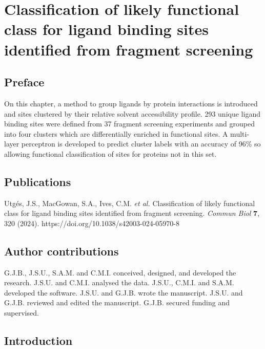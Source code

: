 \chapter{Classification of likely functional class for ligand binding sites identified from fragment screening}

\section*{Preface}

On this chapter, a method to group ligands by protein interactions is introduced and sites clustered by their relative solvent accessibility profile. 293 unique ligand binding sites were defined from 37 fragment screening experiments and grouped into four clusters which are differentially enriched in functional sites. A multi-layer perceptron is developed to predict cluster labels with an accuracy of 96\% so allowing functional classification of sites for proteins not in this set. 

\section*{Publications}

Utgés, J.S., MacGowan, S.A., Ives, C.M. \textit{et al.} Classification of likely functional class for ligand binding sites identified from fragment screening. \textit{Commun Biol} \textbf{7}, 320 (2024). https://doi.org/10.1038/s42003-024-05970-8

\section*{Author contributions}

G.J.B., J.S.U., S.A.M. and C.M.I. conceived, designed, and developed the research. J.S.U. and C.M.I. analysed the data. J.S.U., C.M.I. and S.A.M. developed the software. J.S.U. and G.J.B. wrote the manuscript. J.S.U. and G.J.B. reviewed and edited the manuscript. G.J.B. secured funding and supervised.

\section{Introduction}

